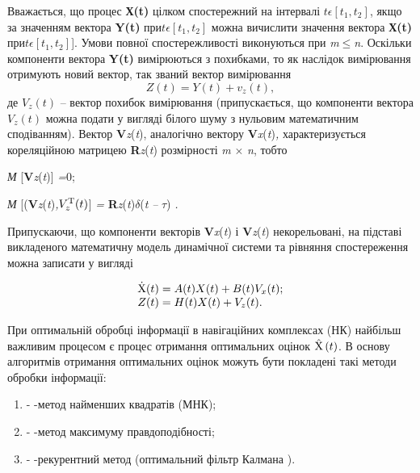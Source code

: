 Вважається, що процес \textbf{Х(t)} цілком спостережний на інтервалі $t \epsilon [t_{1},t_{2}]$,
 якщо за значенням вектора \textbf{Y(t)} при$t \epsilon [t_{1},t_{2}]$ 
можна вичислити значення вектора \textbf{Х(t)} при$t \epsilon [t_{1},t_{2}]$].
Умови повної спостережливості виконуються при \textit{m}$\leq$\textit{n}. Оскільки 
компоненти вектора \textbf{Y(t)} вимірюються з похибками, то як наслідок 
вимірювання отримують новий вектор, так званий вектор вимірювання  
\[ Z(t) = Y(t) + v_{z}(t),\]
де $V_{z}(t)$ --  вектор 
похибок вимірювання (припускається, що компоненти вектора $V_{z}(t)$ 
можна подати у вигляді білого шуму з нульовим математичним сподіванням). Вектор \textbf{V}\textit{z}(\textit{t}), 
аналогічно вектору \textbf{V}\textit{x}(\textit{t})\textit{,} характеризується кореляційною 
матрицею \textbf{R}\textit{z}(\textit{t}) розмірності \textit{m }$\times$\textit{ n}, 
тобто 

\textit{М }[\textbf{V}\textit{z}(\textit{t})]\textit{ =}0; \textit{}

\textit{М }[(\textbf{V}\textit{z}(\textit{t})\textit{,$V_{z}^{{\rm T}} (t)$}]\textit{ = }\textbf{R}\textit{z}(\textit{t})\textbf{$\delta$}(\textit{t} \textit{--} \textit{$\tau$}) \textit{.}

Припускаючи, 
що компоненти векторів \textbf{V}\textit{x}(\textit{t})\textit{ }і \textbf{V}\textit{z}(\textit{t}) 
некорельовані, на підставі викладеного математичну модель динамічної системи та рівняння 
спостереження можна записати у вигляді 

\begin{equation} \label{eq:__11_5_} \begin{array}{l} {\dot{{\rm X} }(t)=A(t)X(t)+B(t)V_{x} 
(t);} \\ {Z(t)=H(t)X(t)+V_{z} (t).} \end{array} \end{equation} 

При оптимальній обробці інформації в навігаційних комплексах (НК) найбільш важливим 
процесом є процес отримання оптимальних оцінок $\hat{{\rm X} }\left(t\right)$. В 
основу алгоритмів отримання оптимальних оцінок можуть бути покладені такі методи 
обробки інформації:

\begin{enumerate}
\item - -метод найменших квадратів (МНК);

\item - -метод максимуму правдоподібності;

\item - -рекурентний метод (оптимальний фільтр  Калмана ).
\end{enumerate}



















